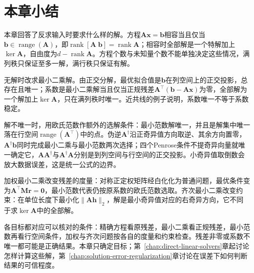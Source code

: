 \FloatBarrier
\section{本章小结}
\label{sec:solution-selection-chapter-summary}

本章回答了反求输入时要求什么样的解。方程$\bm A\bm x=\bm b$相容当且仅当$\bm b\in\operatorname{range}(\bm A)$，即$\operatorname{rank}[\bm A\;\bm b]=\operatorname{rank}\bm A$；相容时全部解是一个特解加上$\ker\bm A$，自由度为$d-\operatorname{rank}\bm A$。方程个数与未知量个数不能单独决定这些情况，满列秩只保证至多一解，满行秩只保证有解。

无解时改求最小二乘解。由正交分解，最优拟合值是$\bm b$在列空间上的正交投影，总存在且唯一；系数是最小二乘解当且仅当正规残差$\bm A^\top(\bm b-\bm A\bm x)$为零，全部解为一个解加上$\ker\bm A$，只在满列秩时唯一。近共线的例子说明，系数唯一不等于系数稳定。

解不唯一时，用欧氏范数作额外的选解条件：最小范数解唯一，并且是解集中唯一落在行空间$\operatorname{range}(\bm A^\top)$中的点。伪逆$\bm A^\dagger$沿正奇异值方向取逆、其余方向置零，$\bm A^\dagger\bm b$同时完成最小二乘与最小范数两次选择；四个Penrose条件不提奇异向量就唯一确定它，$\bm A\bm A^\dagger$与$\bm A^\dagger\bm A$分别是到列空间与行空间的正交投影。小奇异值取倒数会放大数据误差，这是统一公式的边界。

加权最小二乘改变残差的度量：对称正定权矩阵经白化化为普通问题，最优条件变为$\bm A^\top\bm M\bm r=\bm0$，最小范数代表仍按原系数的欧氏范数选取。齐次最小二乘改变约束：在单位长度下最小化$\lVert\bm A\bm h\rVert_2$，解是最小奇异值对应的右奇异方向，它不同于求$\ker\bm A$中的全部解。

各目标都对应可以核对的条件：精确方程看原残差，最小二乘看正规残差，最小范数再看行空间条件，加权与齐次问题按各自的度量和约束检查。残差非零或系数不唯一都可能是正确结果。本章只确定目标；第~\ref{chap:direct-linear-solvers}章起讨论怎样计算这些解，第~\ref{chap:solution-error-regularization}章讨论在误差下如何判断结果的可信程度。
